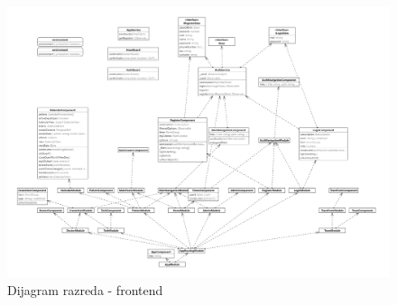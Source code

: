 		   \begin{figure}[H]
			            \includegraphics[width=\textwidth]{slike/frontend_class_diagram.png} %
			          \caption{Dijagram razreda - frontend}
			            \label{fig:promjene2} %
		      \end{figure}
			
			
			
			
			
		
			
			
			
			
			
		
			
